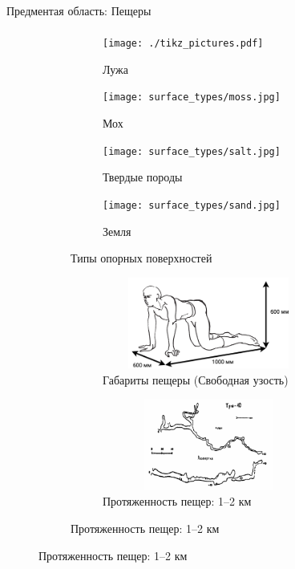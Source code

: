 \begin{frame}[t]{Предментая область: Пещеры}
    \framesubtitle{}
    \vspace{-0.8cm}
    \begin{figure}[H]
        \begin{subfigure}{0.49\textwidth}
            \begin{subfigure}[b]{0.49\textwidth}
                \centering\texttt{[image: ./tikz\_pictures.pdf]}
                \caption{Лужа}
            \end{subfigure}
            \hfill
            \begin{subfigure}[b]{0.49\textwidth}
                \centering\texttt{[image: surface\_types/moss.jpg]}\\
                \caption{Мох}
            \end{subfigure}

            \begin{subfigure}[b]{0.49\textwidth}
                \centering\texttt{[image: surface\_types/salt.jpg]}\\
                \caption{Твердые породы}
            \end{subfigure}
            \begin{subfigure}[b]{0.49\textwidth}
                \centering\texttt{[image: surface\_types/sand.jpg]}\\
                \caption{Земля}
            \end{subfigure}
            \caption*{Типы опорных поверхностей}
        \end{subfigure}
        \begin{subfigure}{0.49\textwidth}
            \begin{subfigure}{0.99\textwidth}
                \centering\includegraphics[height=3cm,width=1\textwidth,keepaspectratio]{../images/human_crawling.png}
                \caption*{Габариты пещеры (Свободная узость)}
            \end{subfigure}

            \begin{subfigure}{0.99\textwidth}
                \centering\includegraphics[height=3cm,width=1\textwidth,keepaspectratio]{../images/cave_maps/map3.png}
                \caption*{Протяженность пещер: 1--2 км}
            \end{subfigure}
        \end{subfigure}
    \end{figure}
\end{frame}

